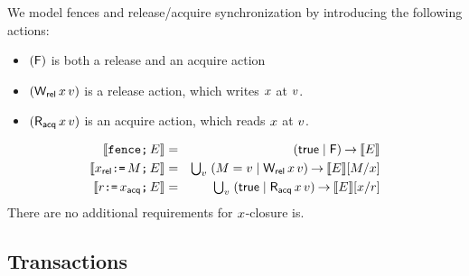 We model fences and release/acquire synchronization by introducing the
following actions:
\begin{itemize}
\item $(\mathsf{F})$ is both a release and an acquire action
\item $(\mathsf{W_{rel}}\,x\,v)$ is a release action, which writes $x$ at $v$.
\item $(\mathsf{R_{acq}}\,x\,v)$ is an acquire action, which reads $x$ at $v$.
\end{itemize}
\begin{eqnarray*}
  \llbracket\texttt{fence}\texttt{;}\, E\rrbracket & = & (\mathsf{true} \mid \mathsf{F}) \mathbin\rightarrow \llbracket E\rrbracket \\
  \llbracket x_{\mathsf{rel}}\texttt{:=}\,M\texttt{;}\, E\rrbracket & = & \textstyle\bigcup_v\; (M=v \mid \mathsf{W_{rel}}\,x\,v) \mathbin\rightarrow \llbracket E\rrbracket[M/x] \\
  \llbracket r\texttt{:=}\,x_{\mathsf{acq}}\texttt{;}\, E\rrbracket & = & \textstyle\bigcup_v\; (\mathsf{true} \mid \mathsf{R_{acq}}\,x\,v) \mathbin\rightarrow \llbracket E\rrbracket[x/r] 
\end{eqnarray*}
There are no additional requirements for $x$-closure is.

\subsection{Transactions}

